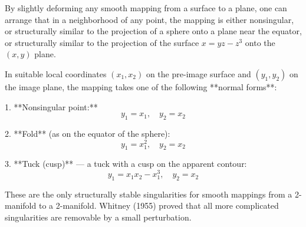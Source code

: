 By slightly deforming any smooth mapping from a surface to a plane, one can arrange that in a neighborhood of any point, the mapping is either nonsingular, or structurally similar to the projection of a sphere onto a plane near the equator, or structurally similar to the projection of the surface $x = yz - z^3$ onto the $(x,y)$ plane.

In suitable local coordinates $(x_1, x_2)$ on the pre-image surface and $(y_1, y_2)$ on the image plane, the mapping takes one of the following **normal forms**:

1. **Nonsingular point:**
   $$y_1 = x_1, \quad y_2 = x_2$$

2. **Fold** (as on the equator of the sphere):
   $$y_1 = x_1^2, \quad y_2 = x_2$$

3. **Tuck (cusp)** — a tuck with a cusp on the apparent contour:
   $$y_1 = x_1 x_2 - x_1^3, \quad y_2 = x_2$$

These are the only structurally stable singularities for smooth mappings from a 2-manifold to a 2-manifold. Whitney (1955) proved that all more complicated singularities are removable by a small perturbation.
